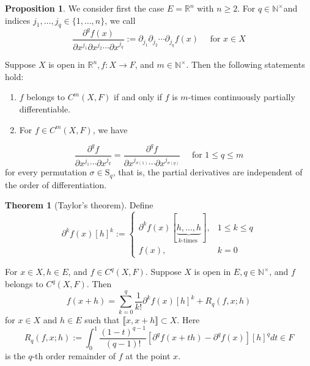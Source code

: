 \documentclass[12pt,a4paper]{book}
\newenvironment{prooff}{{\noindent\it\textcolor{cyan!40!black}{Proof}:}\,}{\par}
\newenvironment{enu}{\begin{enumerate}[(1)]}{\end{enumerate}}
\theoremstyle{definition}
\newtheorem{theo}[defn]{Theorem}
\newtheorem{prop}[defn]{Proposition}
\begin{document}
\begin{prop}
    We consider first the case $E=\mathbb{R}^n$ with $n \geq 2$.
    For $q \in \mathbb{N}^{\times}$and indices $j_1, \ldots, j_q \in\{1, \ldots, n\}$, we call
    $$
    \frac{\partial^q f(x)}{\partial x^{j_1} \partial x^{j_2} \cdots \partial x^{j_q}}:=\partial_{j_1} \partial_{j_2} \cdots \partial_{j_q} f(x) \quad \text { for } x \in X
    $$
    
    Suppose $X$ is open in $\mathbb{R}^n, f: X \rightarrow F$, and $m \in \mathbb{N}^{\times}$. Then the following statements hold:
    \begin{enu}
    \item $f$ belongs to $C^m(X, F)$ if and only if $f$ is $m$-times continuously partially differentiable.
    \item For $f \in C^m(X, F)$, we have
    \end{enu}
    $$
    \frac{\partial^q f}{\partial x^{j_1} \cdots \partial x^{j_q}}=\frac{\partial^q f}{\partial x^{j_{\sigma(1)}} \cdots \partial x^{j_{\sigma(q)}}} \quad \text { for } 1 \leq q \leq m
    $$
    for every permutation $\sigma \in \mathrm{S}_q$, that is, the partial derivatives are independent of the order of differentiation. 
\end{prop}





\begin{theo}[Taylor's theorem]
    Define
    $$
    \partial^k f(x)[h]^k:=\left\{\begin{array}{lr}
    \partial^k f(x)[\underbrace{h, \ldots, h}_{k \text {-times }}], & 1 \leq k \leq q \\
    f(x), & k=0
    \end{array}\right.
    $$
    
    For $x \in X, h \in E$, and $f \in C^q(X, F)$.
    Suppose $X$ is open in $E, q \in \mathbb{N}^{\times}$, and $f$ belongs to $C^q(X, F)$. Then
    $$
    f(x+h)=\sum_{k=0}^q \frac{1}{k!} \partial^k f(x)[h]^k+R_q(f, x ; h)
    $$
    for $x \in X$ and $h \in E$ such that $\llbracket x, x+h \rrbracket \subset X$. Here
    $$
    R_q(f, x ; h):=\int_0^1 \frac{(1-t)^{q-1}}{(q-1)!}\left[\partial^q f(x+t h)-\partial^q f(x)\right][h]^q d t \in F
    $$
    is the $q$-th order remainder of $f$ at the point $x$.
\end{theo}
\end{document}
